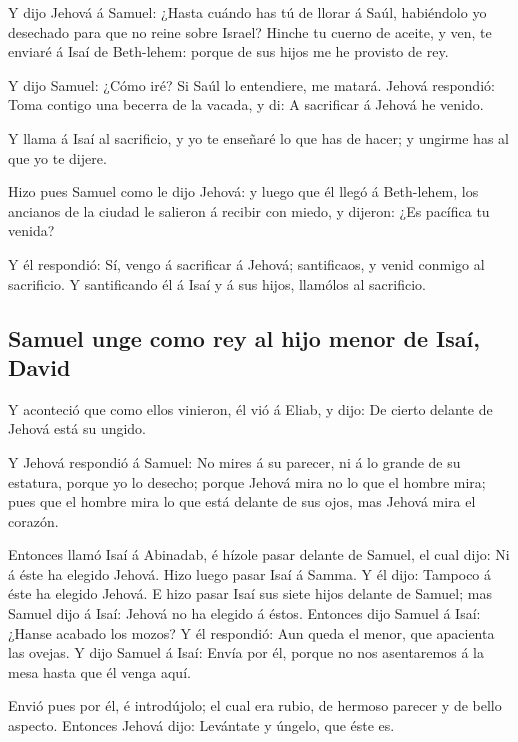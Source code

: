  Y dijo Jehová á Samuel: ¿Hasta cuándo has tú de llorar á
Saúl, habiéndolo yo desechado para que no reine sobre Israel? Hinche tu
cuerno de aceite, y ven, te enviaré á Isaí de Beth-lehem: porque de sus
hijos me he provisto de rey.

 Y dijo Samuel: ¿Cómo iré? Si Saúl lo entendiere, me matará.
Jehová respondió: Toma contigo una becerra de la vacada, y di: A
sacrificar á Jehová he venido.

 Y llama á Isaí al sacrificio, y yo te enseñaré lo que has
de hacer; y ungirme has al que yo te dijere.

 Hizo pues Samuel como le dijo Jehová: y luego que él llegó
á Beth-lehem, los ancianos de la ciudad le salieron á recibir con miedo,
y dijeron: ¿Es pacífica tu venida?

 Y él respondió: Sí, vengo á sacrificar á Jehová;
santificaos, y venid conmigo al sacrificio. Y santificando él á Isaí y á
sus hijos, llamólos al sacrificio.

\hypertarget{samuel-unge-como-rey-al-hijo-menor-de-isauxed-david}{%
\subsection{Samuel unge como rey al hijo menor de Isaí,
David}\label{samuel-unge-como-rey-al-hijo-menor-de-isauxed-david}}

 Y aconteció que como ellos vinieron, él vió á Eliab, y
dijo: De cierto delante de Jehová está su ungido.

 Y Jehová respondió á Samuel: No mires á su parecer, ni á lo
grande de su estatura, porque yo lo desecho; porque Jehová mira no lo
que el hombre mira; pues que el hombre mira lo que está delante de sus
ojos, mas Jehová mira el corazón.

 Entonces llamó Isaí á Abinadab, é hízole pasar delante de
Samuel, el cual dijo: Ni á éste ha elegido Jehová.  Hizo
luego pasar Isaí á Samma. Y él dijo: Tampoco á éste ha elegido Jehová.
 E hizo pasar Isaí sus siete hijos delante de Samuel; mas
Samuel dijo á Isaí: Jehová no ha elegido á éstos.  Entonces
dijo Samuel á Isaí: ¿Hanse acabado los mozos? Y él respondió: Aun queda
el menor, que apacienta las ovejas. Y dijo Samuel á Isaí: Envía por él,
porque no nos asentaremos á la mesa hasta que él venga aquí.

 Envió pues por él, é introdújolo; el cual era rubio, de
hermoso parecer y de bello aspecto. Entonces Jehová dijo: Levántate y
úngelo, que éste es.

